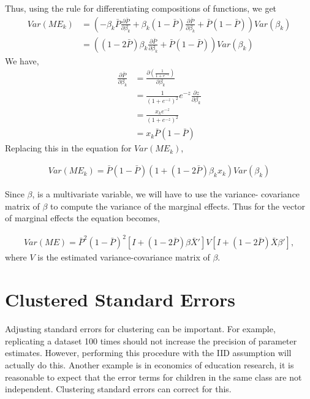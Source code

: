 Thus, using the rule for differentiating compositions of functions, we get
\begin{align*}
  Var(ME_k) & = \left(-\beta_k \bar{P} \frac{\partial \bar{P}}{\partial \beta_k} +
              \beta_k (1-\bar{P})\frac{\partial \bar{P}}{\partial \beta_k} +
              \bar{P}(1-\bar{P}) \right) Var(\beta_k) \\
          & = \left( (1-2\bar{P})\beta_k \frac{\partial \bar{P}}{\partial \beta_k} + \bar{P}(1-\bar{P}) \right) Var(\beta_k)
\end{align*}
We have,
\begin{align*}
  \frac{\partial \bar{P}}{\partial \beta_k} & = \frac{\partial (\frac{1}{1 + e^{-z}})}{\partial \beta_k} \\
                                 & = \frac{1}{(1+e^{-z})^2} e^{-z} \frac{\partial z}{\partial \beta_k} \\
                                 & = \frac{x_k e^{-z}}{(1+e^{-z})^2} \\
                                 & = x_k \bar{P} (1 - \bar{P})
\end{align*}
Replacing this in the equation for $Var(ME_k)$,

\begin{align*}
  Var(ME_k) =  \bar{P}(1-\bar{P}) \left(1 + (1-2\bar{P})\beta_k x_k \right) Var(\beta_k)
\end{align*}

Since $\beta$, is a multivariate variable, we will have to use the variance-
covariance matrix of $\beta$  to compute the variance of the marginal effects.
Thus for the vector of marginal effects the equation becomes,

\begin{gather*}
  Var(ME) = \bar{P}^2(1-\bar{P})^2 \left[I + (1-2\bar{P})\beta \bar{X}' \right] V \left[I+ (1-2\bar{P}) \bar{X} \beta' \right],
\end{gather*}
where $V$ is the estimated variance-covariance matrix of $\beta$.

\section{Clustered Standard Errors} %
\label{sec:clustered_standard_errors}
Adjusting standard errors for clustering can be important. For
example, replicating a dataset 100 times should not increase the
precision of parameter estimates. However, performing this procedure
with the IID assumption will actually do this. Another example is in
economics of education research, it is reasonable to expect that the
error terms for children in the same class are not
independent. Clustering standard errors can correct for this.


